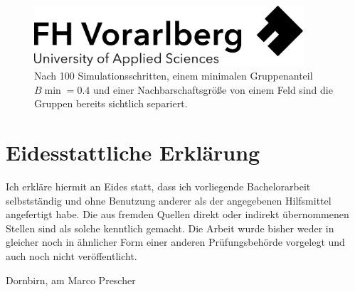 \documentclass[a4paper, fontsize=11pt, parskip=half, twoside]{scrreprt}
\begin{document}
	\begin{figure}[H]
		\centering
		\includegraphics[width = 10cm]{assets/Logo-A3.jpg}
		\caption{Nach 100 Simulationsschritten, einem minimalen Gruppenanteil $B{\min} = 0.4$ und einer Nachbarschaftsgröße von einem Feld sind die Gruppen bereits sichtlich separiert.}
		\label{fig:schelling_end}
	\end{figure}
	
	\clearpage
	\printbibliography
	
	\clearpage
	\section*{Eidesstattliche Erklärung}
	Ich erkläre hiermit an Eides statt, dass ich vorliegende Bachelorarbeit selbstständig und ohne Benutzung anderer als der angegebenen Hilfsmittel angefertigt habe. 
	Die aus fremden Quellen direkt oder indirekt übernommenen Stellen sind als solche kenntlich gemacht. 
	Die Arbeit wurde bisher weder in gleicher noch in ähnlicher Form einer anderen Prüfungsbehörde vorgelegt und auch noch nicht veröffentlicht.
	
	\vspace{3cm}
	\noindent
	Dornbirn, am  \hfill Marco Prescher
	
	
\end{document}
